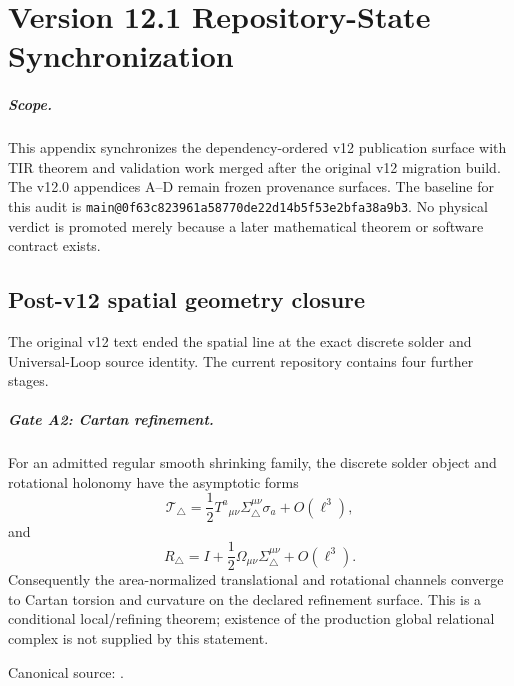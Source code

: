 
\chapter{Version 12.1 Repository-State Synchronization}
\label{app:v12_1_repository_sync}

\paragraph{Scope.}
This appendix synchronizes the dependency-ordered v12 publication surface with
TIR theorem and validation work merged after the original v12 migration build.
The v12.0 appendices A--D remain frozen provenance surfaces.  The baseline for
this audit is \texttt{main@0f63c823961a58770de22d14b5f53e2bfa38a9b3}.
No physical verdict is promoted merely because a later mathematical theorem or
software contract exists.

\section{Post-v12 spatial geometry closure}

The original v12 text ended the spatial line at the exact discrete solder and
Universal-Loop source identity.  The current repository contains four further
stages.

\paragraph{Gate A2: Cartan refinement.}
For an admitted regular smooth shrinking family, the discrete solder object and
rotational holonomy have the asymptotic forms
\[
\mathcal T_{\triangle}
=\frac12 T^a{}_{\mu\nu}\Sigma^{\mu\nu}_{\triangle}\sigma_a
+O(\ell^3),
\]
and
\[
R_{\triangle}
=I+\frac12\Omega_{\mu\nu}\Sigma^{\mu\nu}_{\triangle}
+O(\ell^3).
\]
Consequently the area-normalized translational and rotational channels converge
to Cartan torsion and curvature on the declared refinement surface.  This is a
conditional local/refining theorem; existence of the production global
relational complex is not supplied by this statement.

Canonical source:
.

